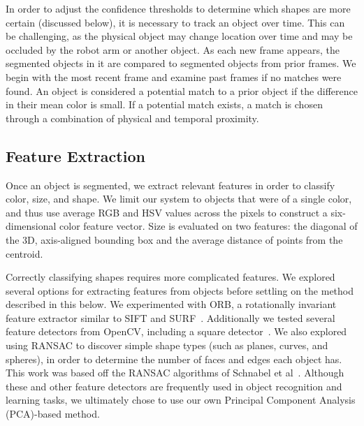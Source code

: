 \documentclass[11pt]{article}
\begin{document}
In order to adjust the confidence thresholds to determine which shapes are more
certain (discussed below), it is necessary to track an object over time. This can
be challenging, as the physical object may change location over time and may be
occluded by the robot arm or another object. As each new frame appears, the
segmented objects in it are compared to segmented objects from prior frames.
We begin with the most recent frame and examine past frames if no matches were
found.  An object is considered a potential match to a prior object if the difference
in their mean color is small. If a potential match exists, a match is chosen
through a combination of physical and temporal proximity.

\subsection{Feature Extraction}
Once an object is segmented, we extract relevant features in order to classify
color, size, and shape. We limit our system to objects that were of a single color,
and thus use average RGB and HSV values across the pixels to construct a
six-dimensional color feature vector. Size is evaluated on two features: the
diagonal of the 3D, axis-aligned bounding box and the average distance of
points from the centroid.

Correctly classifying shapes requires more complicated features.
We explored several options for extracting features from
objects before settling on the method described in this below. We experimented
with ORB, a rotationally invariant feature extractor similar to SIFT and
SURF~\cite{rublee2011orb}. Additionally we tested several feature detectors
from OpenCV, including a square detector~\cite{opencv_library}. We also explored
using RANSAC to discover simple shape types (such as planes, curves, and spheres),
in order to determine the number of faces and edges each object has. This work
was based off the RANSAC algorithms of Schnabel et al~\cite{schnabel2007efficient}.
Although these and other feature detectors are
frequently used in object recognition and learning tasks, we ultimately chose to
use our own Principal Component Analysis (PCA)-based method.
\end{document}
